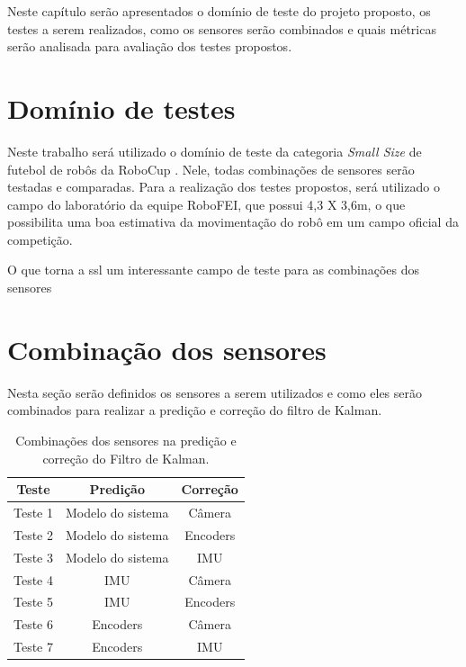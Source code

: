 \documentclass[acronym, symbols]{fei}
\begin{document}
	Neste capítulo serão apresentados o domínio de teste do projeto proposto, os testes a serem realizados, como os sensores serão combinados e quais métricas serão analisada para avaliação dos testes propostos.
	
	\section{Domínio de testes}
	
		Neste trabalho será utilizado o domínio de teste da categoria \textit{Small Size} de futebol de robôs da RoboCup \cite{RoboCup}. Nele, todas combinações de sensores serão testadas e comparadas. Para a realização dos testes propostos, será utilizado o campo do laboratório da equipe RoboFEI, que possui 4,3 X 3,6m, o que possibilita uma boa estimativa da movimentação do robô em um campo oficial da competição.
		
		O que torna a \acrshort{ssl} um interessante campo de teste para as combinações dos sensores 
		
	
	\section{Combinação dos sensores}
	
		Nesta seção serão definidos os sensores a serem utilizados e como eles serão combinados para realizar a predição e correção do filtro de Kalman.
		
		\begin{table}[!htb]
			\centering
			\caption{Combinações dos sensores na predição e correção do Filtro de Kalman.}
			\label{tbl:combinacao_sensores}
			\begin{tabular}{|c|c|c|}
				\hline
				\textbf{Teste}   & \textbf{Predição}          & \textbf{Correção} \\ \hline
				Teste 1 & Modelo do sistema & Câmera   \\ \hline
				Teste 2 & Modelo do sistema & Encoders \\ \hline
				Teste 3 & Modelo do sistema & IMU      \\ \hline
				Teste 4 & IMU               & Câmera   \\ \hline
				Teste 5 & IMU               & Encoders \\ \hline
				Teste 6 & Encoders          & Câmera   \\ \hline
				Teste 7 & Encoders          & IMU      \\ \hline
			\end{tabular}
		\end{table}
	
\end{document}
